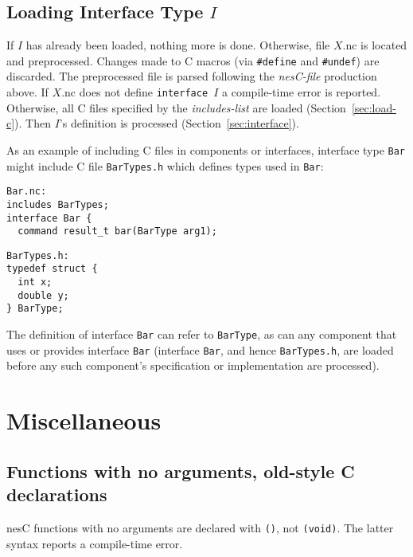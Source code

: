 \documentclass[11pt]{article}
\newcommand{\code}[1]{{\tt #1}}
\newcommand{\file}[1]{{\tt #1}}
\newcommand{\nesc}{nesC\xspace}
\begin{document}
\subsection{Loading Interface Type $I$}
\label{sec:load-intf}

If $I$ has already been loaded, nothing more is done. Otherwise, file
$X$.nc is located and preprocessed. Changes made to C macros (via
\code{\#define} and \code{\#undef}) are discarded. The preprocessed file is
parsed following the \emph{nesC-file} production above. If $X$.nc does not
define \code{interface $I$} a compile-time error is reported. Otherwise,
all C files specified by the \emph{includes-list} are loaded
(Section~\ref{sec:load-c}). Then $I$'s definition is processed
(Section~\ref{sec:interface}).

As an example of including C files in components or interfaces, interface
type \code{Bar} might include C file \file{BarTypes.h} which defines types
used in \code{Bar}:

\begin{minipage}[t]{3in}
\begin{verbatim}
Bar.nc:
includes BarTypes;
interface Bar {
  command result_t bar(BarType arg1);
\end{verbatim}
\end{minipage}
\begin{minipage}[t]{3in}
\begin{verbatim}
BarTypes.h:
typedef struct {
  int x;
  double y;
} BarType;
\end{verbatim}
\end{minipage}

The definition of interface \code{Bar} can refer to \code{BarType}, as can
any component that uses or provides interface \code{Bar} (interface
\code{Bar}, and hence \file{BarTypes.h}, are loaded before any such
component's specification or implementation are processed).

\section{Miscellaneous}
\label{sec:misc}

\subsection{Functions with no arguments, old-style C declarations}
\label{sec:misc-void}

\nesc functions with no arguments are declared with \code{()}, not
\code{(void)}. The latter syntax reports a compile-time error.
\end{document}
